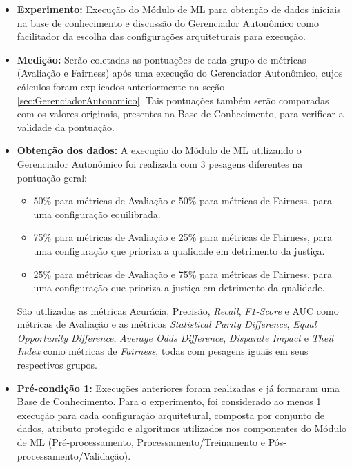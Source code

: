 \documentclass[Portugues,Final]{ic-tese-v3}
\begin{document}
\begin{itemize}
\item \textbf{Experimento:} Execução do Módulo de ML para obtenção de dados iniciais na base de conhecimento e discussão do Gerenciador Autonômico como facilitador da escolha das configurações arquiteturais para execução.

\item \textbf{Medição:} Serão coletadas as pontuações de cada grupo de métricas (Avaliação e Fairness) após uma execução do Gerenciador Autonômico, cujos cálculos foram explicados anteriormente na seção \ref{sec:GerenciadorAutonomico}. Tais pontuações também serão comparadas com os valores originais, presentes na Base de Conhecimento, para verificar a validade da pontuação.

\item \textbf{Obtenção dos dados:} A execução do Módulo de ML utilizando o Gerenciador Autonômico foi realizada com 3 pesagens diferentes na pontuação geral:

\begin{itemize}
\item 50\% para métricas de Avaliação e 50\% para métricas de Fairness, para uma configuração equilibrada.
\item 75\% para métricas de Avaliação e 25\% para métricas de Fairness, para uma configuração que prioriza a qualidade em detrimento da justiça.
\item 25\% para métricas de Avaliação e 75\% para métricas de Fairness, para uma configuração que prioriza a justiça em detrimento da qualidade.
\end{itemize}

São utilizadas as métricas Acurácia, Precisão, \textit{Recall}, \textit{F1-Score} e AUC como métricas de Avaliação e as métricas \textit{Statistical Parity Difference}, \textit{Equal Opportunity Difference}, \textit{Average Odds Difference}, \textit{Disparate Impact} e \textit{Theil Index} como métricas de \textit{Fairness}, todas com pesagens iguais em seus respectivos grupos.

\item \textbf{Pré-condição 1:} Execuções anteriores foram realizadas e já formaram uma Base de Conhecimento. Para o experimento, foi considerado ao menos 1 execução para cada configuração arquitetural, composta por conjunto de dados, atributo protegido e algoritmos utilizados nos componentes do Módulo de ML (Pré-processamento, Processamento/Treinamento e Pós-processamento/Validação).


\end{itemize}
\end{document}
